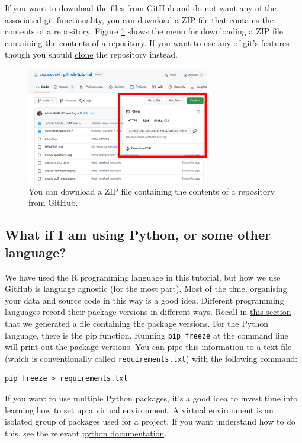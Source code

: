 \documentclass[11pt,onecolumn]{scrartcl}
\begin{document}
If you want to download the files from GitHub and do not want any of the
associated git functionality, you can download a ZIP file that contains the
contents of a repository. Figure \ref{fig:download-zip-file} shows the menu for
downloading a ZIP file containing the contents of a repository. If you want to
use any of git's features though you should \hyperref[sec:org434e06c]{clone} the repository instead.

\begin{figure}[htbp]
\centering
\includegraphics[width=8cm]{./download-zip-file.png}
\caption{\label{fig:download-zip-file}You can download a ZIP file containing the contents of a repository from GitHub.}
\end{figure}

\subsection{What if I am using Python, or some other language?}
\label{sec:org5ca98cd}

We have used the R programming language in this tutorial, but how we use GitHub
is language agnostic (for the most part). Most of the time, organising your data
and source code in this way is a good idea. Different programming languages
record their package versions in different ways. Recall in \hyperref[sec:org53251f3]{this section} that we
generated a file containing the package versions. For the Python language, there
is the pip function. Running \texttt{pip freeze} at the command line will print out the
package versions. You can pipe this information to a text file (which is
conventionally called \texttt{requirements.txt}) with the following command:

\lstset{language=sh,label= ,caption= ,captionpos=b,numbers=none}
\begin{lstlisting}
pip freeze > requirements.txt
\end{lstlisting}

If you want to use multiple Python packages, it's a good idea to invest time
into learning how to set up a virtual environment. A virtual environment is an
isolated group of packages used for a project. If you want understand how to do
this, see the relevant \href{https://docs.python.org/3/tutorial/venv.html}{python documentation}.
\end{document}
